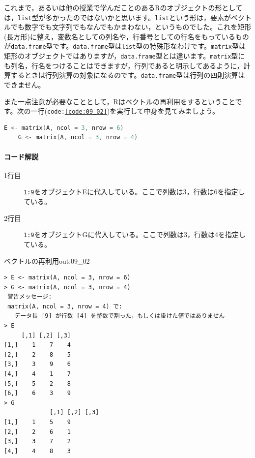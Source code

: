 \documentclass{ltjsbook}
\begin{document}
これまで，あるいは他の授業で学んだことのあるRのオブジェクトの形としては，\texttt{list}型が多かったのではないかと思います。\texttt{list}という形は，要素がベクトルでも数字でも文字列でもなんでもかまわない，というものでした。これを矩形(長方形)に整え，変数名としての列名や，行番号としての行名をもっているものが\texttt{data.frame}型です。\texttt{data.frame}型は\texttt{list}型の特殊形なわけです。\texttt{matrix}型は矩形のオブジェクトではありますが，\texttt{data.frame}型とは違います。\texttt{matrix}型にも列名，行名をつけることはできますが，行列であると明示してあるように，計算するときは行列演算の対象になるのです。\texttt{data.frame}型は行列の四則演算はできません。

また一点注意が必要なこととして，Rはベクトルの再利用をするということです。次の一行(\texttt{code:\ref{code:09_02}})を実行して中身を見てみましょう。

\begin{lstlisting}[language=c++,label={code:09_02},caption={ベクトルデータの保持}]
    E <- matrix(A, ncol = 3, nrow = 6)
    G <- matrix(A, ncol = 3, nrow = 4)
\end{lstlisting}
\paragraph{コード解説}
\begin{description}
	\item[1行目] \texttt{1:9}をオブジェクトEに代入している。ここで列数は3，行数は6を指定している。
	\item[2行目] \texttt{1:9}をオブジェクトGに代入している。ここで列数は3，行数は4を指定している。
\end{description}

\begin{Rscreen}{ベクトルの再利用}{out:09_02}
	\begin{verbatim}
> E <- matrix(A, ncol = 3, nrow = 6)
> G <- matrix(A, ncol = 3, nrow = 4)
 警告メッセージ: 
 matrix(A, ncol = 3, nrow = 4) で: 
   データ長 [9] が行数 [4] を整数で割った，もしくは掛けた値ではありません 
> E
     [,1] [,2] [,3]
[1,]    1    7    4
[2,]    2    8    5
[3,]    3    9    6
[4,]    4    1    7
[5,]    5    2    8
[6,]    6    3    9
> G
             [,1] [,2] [,3]
[1,]    1    5    9
[2,]    2    6    1
[3,]    3    7    2
[4,]    4    8    3
\end{verbatim}
\end{Rscreen}
\end{document}
